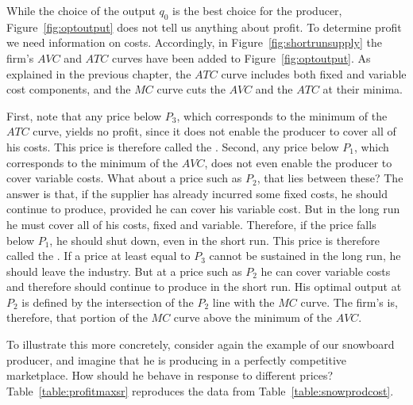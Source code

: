 \newhtmlpage

While the choice of the output $q_{0}$ is the best choice for the producer,
Figure~\ref{fig:optoutput} does not tell us anything about profit. To
determine profit we need information on costs. Accordingly, in
Figure~\ref{fig:shortrunsupply} the firm's $AVC$ and $ATC$ curves have been added to
Figure~\ref{fig:optoutput}. As explained in the previous chapter, the $ATC$
curve includes both fixed and variable cost components, and the $MC$ curve
cuts the $AVC$ and the $ATC$ at their minima.



\newhtmlpage

First, note that any price below $P_{3}$, which corresponds to the minimum
of the $ATC$ curve, yields no profit, since it does not enable the producer
to cover all of his costs. This price is therefore called the 
. Second, any price below $P_{1}$, which
corresponds to the minimum of the $AVC$, does not even enable the producer
to cover variable costs. What about a price such as $P_{2}$, that lies
between these? The answer is that, if the supplier has already incurred some
fixed costs, he should continue to produce, provided he can cover his
variable cost. But in the long run he must cover all of his costs, fixed and
variable. Therefore, if the price falls below $P_{1}$, he should shut down,
even in the short run. This price is therefore called the %
. If a price at least equal to $P_{3}$ cannot
be sustained in the long run, he should leave the industry. But at a price
such as $P_{2}$ he can cover variable costs and therefore should continue to
produce in the short run. His optimal output at $P_{2}$ is defined by the
intersection of the $P_{2}$ line with the $MC$ curve. The firm's 
 is, therefore, that portion of the $MC$
curve above the minimum of the $AVC$.

To illustrate this more concretely, consider again the example of our
snowboard producer, and imagine that he is producing in a perfectly
competitive marketplace. How should he behave in response to different
prices? Table~\ref{table:profitmaxsr} reproduces the data from Table~\ref{table:snowprodcost}.

